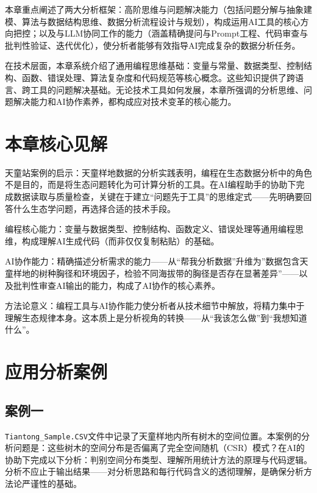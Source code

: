 \documentclass[
  twoside,12pt,fontset=none]{ctexbook}
\begin{document}
本章重点阐述了两大分析框架：高阶思维与问题解决能力（包括问题分解与抽象建模、算法与数据结构思维、数据分析流程设计与规划），构成运用AI工具的核心方向把控；以及与LLM协同工作的能力（涵盖精确提问与Prompt工程、代码审查与批判性验证、迭代优化），使分析者能够有效指导AI完成复杂的数据分析任务。

在技术层面，本章系统介绍了通用编程思维基础：变量与常量、数据类型、控制结构、函数、错误处理、算法复杂度和代码规范等核心概念。这些知识提供了跨语言、跨工具的问题解决基础。无论技术工具如何发展，本章所强调的分析思维、问题解决能力和AI协作素养，都构成应对技术变革的核心能力。

\hypertarget{ux672cux7ae0ux6838ux5fc3ux89c1ux89e3}{%
\section{本章核心见解}\label{ux672cux7ae0ux6838ux5fc3ux89c1ux89e3}}

天童站案例的启示：天童样地数据的分析实践表明，编程在生态数据分析中的角色不是目的，而是将生态问题转化为可计算分析的工具。在AI编程助手的协助下完成数据读取与质量检查，关键在于建立``问题先于工具''的思维定式------先明确要回答什么生态学问题，再选择合适的技术手段。

编程核心能力：变量与数据类型、控制结构、函数定义、错误处理等通用编程思维，构成理解AI生成代码（而非仅仅复制粘贴）的基础。

AI协作能力：精确描述分析需求的能力------从``帮我分析数据''升维为''数据包含天童样地的树种胸径和环境因子，检验不同海拔带的胸径是否存在显著差异''------以及批判性审查AI输出的能力，构成了AI协作的核心素养。

方法论意义：编程工具与AI协作能力使分析者从技术细节中解放，将精力集中于理解生态规律本身。这本质上是分析视角的转换------从``我该怎么做''到``我想知道什么''。

\hypertarget{ux5e94ux7528ux5206ux6790ux6848ux4f8b}{%
\section{应用分析案例}\label{ux5e94ux7528ux5206ux6790ux6848ux4f8b}}

\hypertarget{ux6848ux4f8bux4e00}{%
\subsection{案例一}\label{ux6848ux4f8bux4e00}}

\texttt{Tiantong\_Sample.CSV}文件中记录了天童样地内所有树木的空间位置。本案例的分析问题是：这些树木的空间分布是否偏离了完全空间随机（CSR）模式？在AI的协助下完成以下分析：判别空间分布类型、理解所用统计方法的原理与代码逻辑。分析不应止于输出结果------对分析思路和每行代码含义的透彻理解，是确保分析方法论严谨性的基础。
\end{document}
